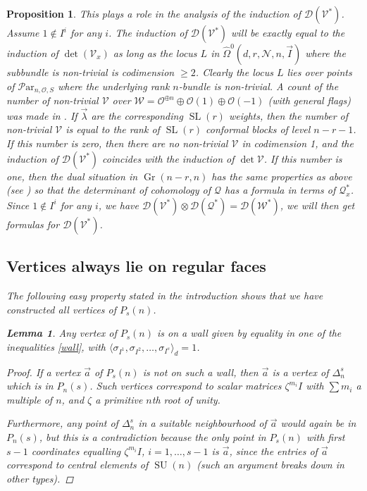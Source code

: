 \documentclass[11pt]{amsart}
\newcommand\op{\operatorname}
\newcommand\mv{\mathcal{V}}
\newcommand\tensor{\otimes}
\newcommand\mw{\mathcal{W}}
\newcommand\mq{\mathcal{Q}}
\newcommand\mn{\mathcal{N}}
\newcommand\Par{\mathcal{P}\text{ar} }
\newcommand\Gr{\operatorname{Gr}}
\newtheorem{proposition}[theorem]{Proposition}
\newtheorem{lemma}[theorem]{Lemma}
\numberwithin{theorem}{subsection}
\begin{document}
{\begin{proposition}
This plays a role in the analysis of the induction of $\mathcal{D}(\mv^*)$. Assume $1\not\in I^i$ for any $i$. The induction of $\mathcal{D}(\mv^*)$ will be exactly equal to the induction of $\det(\mv_x)$ as long as the locus $L$  in $\widehat{\Omega}^0(d,r,\mn,n,\vec{I})$ where the subbundle is non-trivial is codimension $\geq 2$. Clearly the locus $L$ lies over points of ${\Par}_{n,\mathcal{O},S}$
 where the underlying rank $n$-bundle is non-trivial. A count of the number of non-trivial $\mv$ over $\mw=\mathcal{O}^{\oplus n}\oplus \mathcal{O}(1)\oplus\mathcal{O}(-1)$ (with general flags) was made in \cite[Section 9.6]{BGM}. If $\vec{\lambda}$ are the corresponding $\op{SL}(r)$ weights, then the number of non-trivial $\mv$ is equal to the rank of $\op{SL}(r)$ conformal blocks of level  $n-r-1$. If this number is zero, then there are no non-trivial
 $\mv$ in codimension 1, and the induction of $\mathcal{D}(\mv^*)$ coincides with the induction of $\det\mv$. If this number is one, then the dual situation in $\Gr(n-r,n)$ has the same properties as above (see \cite[Prop 1.1]{BGM}) so that the determinant of cohomology of $\mq$ has a formula in terms of $\mq_x^*$. Since $1\not\in I^i$ for any $i$, we have $\mathcal{D}(\mv^*) \tensor \mathcal{D}(\mq^*)= \mathcal{D}(\mw^*)$, we will then get formulas for $\mathcal{D}(\mv^*)$.



\subsection{Vertices always lie on regular faces}
The following easy property stated in the introduction shows that we have constructed all vertices of
$P_s(n)$.
\begin{lemma}\label{pinky}
Any vertex of $P_{s}(n)$ is on a wall given by equality in one of the inequalities \eqref{wall}, with
$\langle\sigma_{I^1}, \sigma_{I^2},\dots,\sigma_{I^s}\rangle_d= 1$.
\end{lemma}
\begin{proof}
If a vertex $\vec{a}$ of $P_{s}(n)$ is not on such a wall, then $\vec{a}$ is a vertex of $\Delta_n^s$ which is in $P_{n}(s)$. Such vertices correspond to scalar matrices $\zeta^{m_i}I$ with $\sum m_i$ a multiple of $n$, and $\zeta$ a primitive $n$th root of unity.

Furthermore, any point of $\Delta_n^s$ in a suitable neighbourhood of $\vec{a}$ would again be in $P_n(s)$, but this is a contradiction because the only point in $P_{s}(n)$  with first $s-1$ coordinates equalling $\zeta^{m_i}I$, $i=1,\dots,s-1$ is $\vec{a}$, since the entries of $\vec{a}$ correspond to central elements of $\operatorname{SU}(n)$ (such an argument breaks down in other types).
\end{proof}

\end{proposition}}
\end{document}
